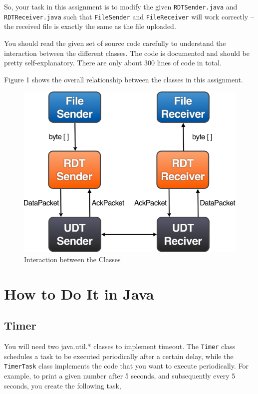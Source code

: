 \documentclass[a4paper,11pt]{exam}
\begin{document}
So, your task in this assignment is to modify the given \texttt{RDTSender.java} and \texttt{RDTReceiver.java} such that \texttt{FileSender} and \texttt{FileReceiver} will work correctly -- the received file is exactly the same as the file uploaded.  

You should read the given set of source code carefully to understand the interaction between the different classes.  The code is documented and should be pretty self-explanatory.  There are only about 300 lines of code in total.

Figure 1 shows the overall relationship between the classes in this assignment.

\begin{figure}
	\begin{center}
	\includegraphics[scale=0.25]{flow-crop.pdf}
	\caption{Interaction between the Classes}
	\end{center}
\end{figure}

\section*{How to Do It in Java}

\subsection*{Timer}

You will need two java.util.* classes to implement timeout.  
The \texttt{Timer} class schedules a task to be executed periodically after a certain delay, while the \texttt{TimerTask} class implements the code that you want to execute periodically.  For example, to print a given number after 5 seconds, and subsequently every 5 seconds, you create the following task, 
\newpage
\end{document}
